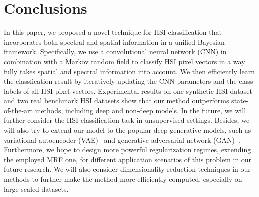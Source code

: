 \documentclass[journal]{IEEEtran}
\begin{document}
		
		
		
		\section{Conclusions}
		In this paper, we proposed a novel technique for HSI {{classification}} that incorporates both spectral and spatial information in a unified Bayesian framework. Specifically, we use a convolutional neural network (CNN) in combination with a Markov random field to classify HSI pixel vectors in a way fully takes spatial and spectral information into account. We then efficiently learn the {{classfication}} result {{by iteratively updating the CNN parameters and the class labels of all HSI pixel vectors}}. Experimental results on one synthetic HSI dataset and two real benchmark HSI datasets show that our method outperforms state-of-the-art methods, including deep and non-deep models. In the future, we will further consider the HSI classification task in unsupervised settings. Besides, we will also try to extend our model to the popular deep generative models, such as variational autoencoder (VAE)~\cite{kingma2013auto} and generative adversarial network (GAN)~\cite{
goodfellow2014generative}. {{Furthermore, we hope to design more powerful regularization regimes, extending the employed MRF one, for different application scenarios of this problem in our future research. We will also consider dimensionality reduction techniques in our methods to further make the method more efficiently computed, especially on large-scaled datasets.}}
		
		
		


		\ifCLASSOPTIONcaptionsoff
		\newpage
		\fi
		
		
		


	
\end{document}
